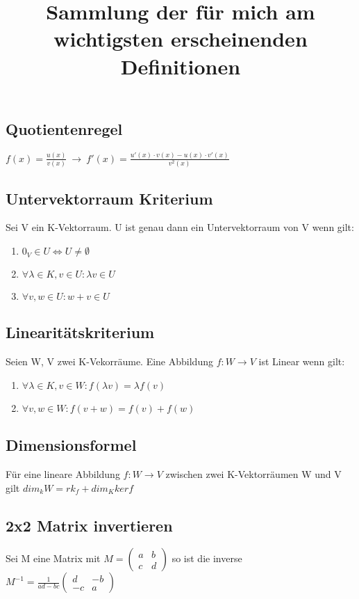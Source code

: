 \documentclass[11pt]{article}
\begin{document}
    \title{Sammlung der für mich am wichtigsten erscheinenden Definitionen}
    \maketitle
    \subsection{Quotientenregel}
    $f(x)=\frac{u(x)}{v(x)}\:\longrightarrow\:f'(x)=\frac{u'(x)\cdot v(x)-u(x)\cdot v'(x)}{v^2(x)}$
    \subsection{Untervektorraum Kriterium}
    Sei V ein K-Vektorraum. \newline
    U ist genau dann ein Untervektorraum von V wenn gilt:
    \begin{enumerate}[label=(\roman*)]
        \item $0_V\in U\Leftrightarrow U \neq \emptyset$
        \item $\forall \lambda \in K, v \in U: \lambda v \in U$
        \item $\forall v,w \in U: w+v \in U$
    \end{enumerate}
    \subsection{Linearitätskriterium}
    Seien W, V zwei K-Vekorräume.
    Eine Abbildung $f:W\rightarrow V$ ist Linear wenn gilt:
    \begin{enumerate}[label=(\roman*)]
    \item $\forall \lambda \in K, v\in W : f(\lambda v)=\lambda f(v)$
    \item $\forall v,w\in W : f(v+w) = f(v)+f(w)$
    \end{enumerate}
    \subsection{Dimensionsformel}
    Für eine lineare Abbildung $f:W\rightarrow V$ zwischen zwei K-Vektorräumen W und V gilt \newline\newline
    $dim_kW = rk_f + dim_Kkerf$
    \subsection{2x2 Matrix invertieren}
    Sei M eine Matrix mit $M=\begin{pmatrix}
                                 a&b\\c&d
    \end{pmatrix}$ so ist die inverse $M^{-1}=\frac{1}{ad-bc}\begin{pmatrix}
                                                                 d&-b\\-c&a
    \end{pmatrix}$
\end{document}
